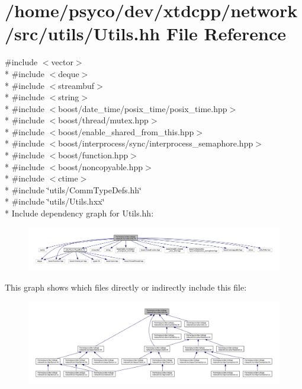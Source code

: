 \hypertarget{Utils_8hh}{}\section{/home/psyco/dev/xtdcpp/network/src/utils/\+Utils.hh File Reference}
\label{Utils_8hh}
{\ttfamily \#include $<$vector$>$}\\*
{\ttfamily \#include $<$deque$>$}\\*
{\ttfamily \#include $<$streambuf$>$}\\*
{\ttfamily \#include $<$string$>$}\\*
{\ttfamily \#include $<$boost/date\+\_\+time/posix\+\_\+time/posix\+\_\+time.\+hpp$>$}\\*
{\ttfamily \#include $<$boost/thread/mutex.\+hpp$>$}\\*
{\ttfamily \#include $<$boost/enable\+\_\+shared\+\_\+from\+\_\+this.\+hpp$>$}\\*
{\ttfamily \#include $<$boost/interprocess/sync/interprocess\+\_\+semaphore.\+hpp$>$}\\*
{\ttfamily \#include $<$boost/function.\+hpp$>$}\\*
{\ttfamily \#include $<$boost/noncopyable.\+hpp$>$}\\*
{\ttfamily \#include $<$ctime$>$}\\*
{\ttfamily \#include \char`\"{}utils/\+Comm\+Type\+Defs.\+hh\char`\"{}}\\*
{\ttfamily \#include \char`\"{}utils/\+Utils.\+hxx\char`\"{}}\\*
Include dependency graph for Utils.\+hh\+:
\nopagebreak
\begin{figure}[H]
\begin{center}
\leavevmode
\includegraphics[width=350pt]{Utils_8hh__incl}
\end{center}
\end{figure}
This graph shows which files directly or indirectly include this file\+:
\nopagebreak
\begin{figure}[H]
\begin{center}
\leavevmode
\includegraphics[width=350pt]{Utils_8hh__dep__incl}
\end{center}
\end{figure}
